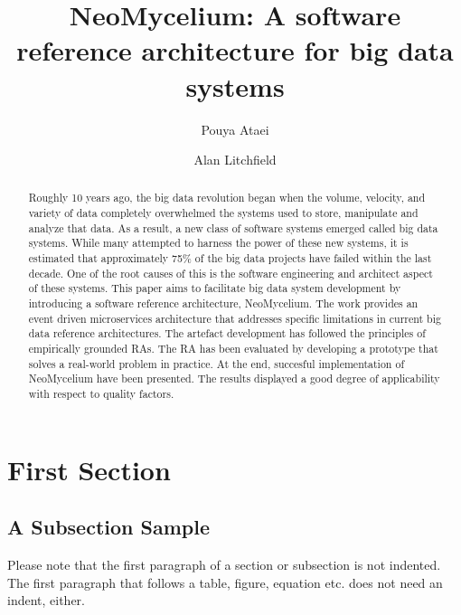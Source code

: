 \documentclass[runningheads]{llncs}
\begin{document}
%
\title{NeoMycelium: A software reference architecture for big data systems}
%
%
\author{Pouya Ataei \and
    Alan Litchfield}
%
%
%
\maketitle              %
%
\begin{abstract}
    Roughly 10 years ago, the big data revolution began when the volume, velocity, and variety of data completely overwhelmed the systems used to store, manipulate and analyze that data. As a result, a new class of software systems emerged called big data systems. While many attempted to harness the power of these new systems, it is estimated that approximately 75\% of the big data projects have failed within the last decade. One of the root causes of this is the software engineering and architect aspect of these systems. This paper aims to facilitate big data system development by introducing a software reference architecture, NeoMycelium. The work provides an event driven microservices architecture that addresses specific limitations in current big data reference architectures. The artefact development has followed the principles of empirically grounded RAs. The RA has been evaluated by developing a prototype that solves a real-world problem in practice. At the end, succesful implementation of NeoMycelium have been presented. The results displayed a good degree of applicability with respect to quality factors.

\end{abstract}
%
%
%
\section{First Section}
\subsection{A Subsection Sample}
Please note that the first paragraph of a section or subsection is
not indented. The first paragraph that follows a table, figure,
equation etc. does not need an indent, either.
\end{document}

